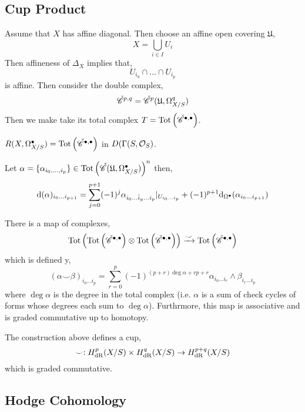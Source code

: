 \documentclass[12pt]{article}
\begin{document}
\subsection{Cup Product}

\renewcommand{\U}{\mathfrak{U}}
\newcommand{\Tot}[1]{\mathrm{Tot} \left( #1 \right)}

\begin{remark}
Assume that $X$ has affine diagonal. Then choose an affine open covering $\U$,
\[ X = \bigcup_{i \in I} U_i \]
Then affineness of $\Delta_X$ implies that,
\[ U_{i_0} \cap \dots \cap U_{i_p} \]
is affine. Then consider the double complex,
\[ \Cech^{p,q} = \Cech^p(\U, \Omega^q_{X / S}) \]
Then we make take its total complex $T = \Tot{\Cech^{\bullet, \bullet}}$. 
\end{remark}

\begin{lemma}
$R (X, \Omega^\bullet_{X / S}) = \Tot{\Cech^{\bullet, \bullet}}$ in $D(\Gamma(S, \mathcal{O}_{S})$. 
\end{lemma}

\begin{remark}
Let $\alpha = \{ \alpha_{i_0, \dots, i_p} \} \in \Tot{\Cech(\U, \Omega^\bullet_{X / S})}^n$ then,
\[ \mathrm{d}{(\alpha)_{i_0 \dots i_{p+1}}} = \sum_{j = 0}^{p + 1} (-1)^j \alpha_{i_0 \dots \hat{i}_g \dots i_p} |_{U_{i_0 \dots i_p}} + (-1)^{p+1} \mathrm{d}{}_{\Omega^\bullet}(\alpha_{i_0 \dots i_{p + 1}}) \]
\end{remark}

\begin{proposition}
There is a map of complexes,
\[ \Tot{\Tot{\Cech^{\bullet, \bullet}} \otimes \Tot{\Cech^{\bullet, \bullet}}} \xrightarrow{\smile} \Tot{\Cech^{\bullet, \bullet}} \]
which is defined y,
\[ (\alpha \smile \beta)_{i_0 \dots i_p} = \sum_{r = 0}^{p} (-1)^{(p + r) \deg{\alpha} + rp + r} \alpha_{i_0 \dots i_r} \wedge \beta_{i_r \dots i_p} \]
where $\deg{\alpha}$ is the degree in the total complex (i.e. $\alpha$ is a sum of check cycles of forms whose degrees each sum to $\deg{\alpha}$). 
Furthrmore, this map is associative and is graded commutative up to homotopy.  
\end{proposition}

\begin{proposition}
The construction above defines a cup,
\[ \smile : H^p_{\mathrm{dR}}(X / S) \times H^q_{\mathrm{dR}}(X / S) \to H^{p + q}_{\mathrm{dR}}(X / S) \]
which is graded commutative.
\end{proposition}

\subsection{Hodge Cohomology}
\end{document}
